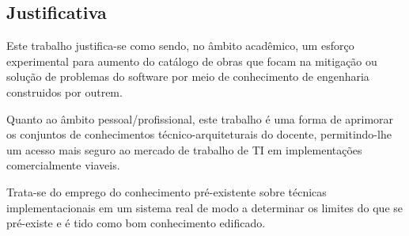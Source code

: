 

\subsection{\textbf{Justificativa}}
    \label{sec:justificativa}
    
    Este trabalho justifica-se como sendo, no âmbito acadêmico, um esforço experimental
    para aumento do catálogo de obras que focam na mitigação ou solução de problemas
    do software por meio de conhecimento de engenharia construidos por outrem.

    Quanto ao âmbito pessoal/profissional, este trabalho é uma forma de aprimorar os conjuntos
    de conhecimentos técnico-arquiteturais do docente, permitindo-lhe um acesso mais seguro
    ao mercado de trabalho de TI em implementações comercialmente viaveis.

    Trata-se do emprego do conhecimento pré-existente sobre técnicas implementacionais
    em um sistema real de modo a determinar os limites do que se pré-existe e é tido
    como bom conhecimento edificado.

    
